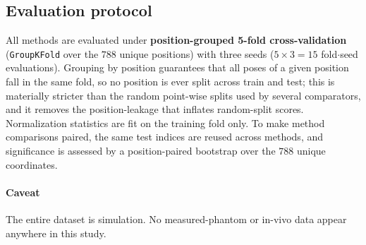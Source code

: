 \subsection{Evaluation protocol}
All methods are evaluated under \textbf{position-grouped 5-fold cross-validation}
(\texttt{GroupKFold} over the $788$ unique positions) with three seeds
($5\times3 = 15$ fold$\cdot$seed evaluations). Grouping by position guarantees
that all poses of a given position fall in the same fold, so no position is ever
split across train and test; this is materially stricter than the random
point-wise splits used by several comparators, and it removes the
position-leakage that inflates random-split scores. Normalization statistics are
fit on the training fold only. To make method comparisons paired, the same test
indices are reused across methods, and significance is assessed by a
position-paired bootstrap over the $788$ unique coordinates.

\paragraph*{Caveat}
The entire dataset is simulation. No measured-phantom or in-vivo data appear
anywhere in this study.
